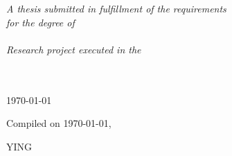 \documentclass[
11pt, %
american, %
singlespacing, %
parskip, %
headsepline, %
table,
dvipsnames
]{MastersDoctoralThesis} %
\begin{document}
\begin{titlepage}
\begin{center}
\vfill

\large \textit{A thesis submitted in fulfillment of the requirements\\ for the degree of }\\
\large \textit{\degreename}\\[0.5cm] %
\textit{Research project executed in the}\\
\groupname\\\deptname\\[2cm] %
 
\vfill

{\large \today}\\[3cm] %
 
\vfill
\end{center}
\end{titlepage}

\ifdefined\drafting
	\vspace*{0.2\textheight}
	\drafting

	Compiled on
	\noindent \today, \currenttime
	\bigbreak

	\hfill YING
\else
\fi
\ifdefined\drafting
\else
\fi


\ifdefined\drafting
\else
\fi





\ifdefined\drafting
\else


\end{document}
